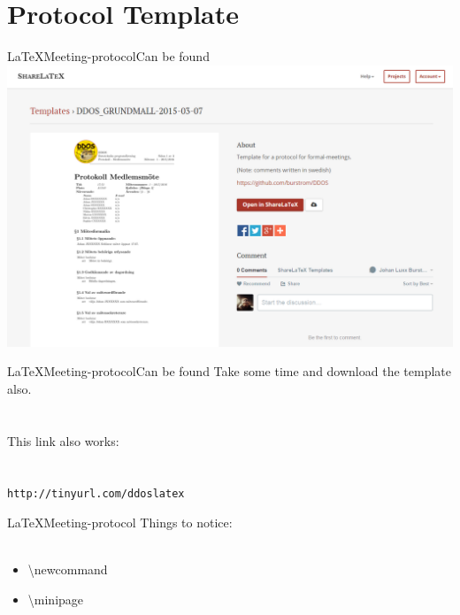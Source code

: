 \section{Protocol Template}
\begin{frame}{\LaTeX Meeting-protocol}{Can be found \where}
    \includegraphics[width=\textwidth]{img/3-protlatex.png}
\end{frame}

\begin{frame}{\LaTeX Meeting-protocol}{Can be found \where}
    Take some time and download the template also. \\ \ \\ \ \\
    \small This link also works: \\ \ \\ \ \\
    \normalsize
    \texttt{http://tinyurl.com/ddoslatex}
\end{frame}

\begin{frame}{\LaTeX Meeting-protocol}
	Things to notice: \\ \ 
	\begin{itemize}
	\item \textbackslash newcommand
	\item \textbackslash minipage
	\end{itemize} 
\end{frame}

